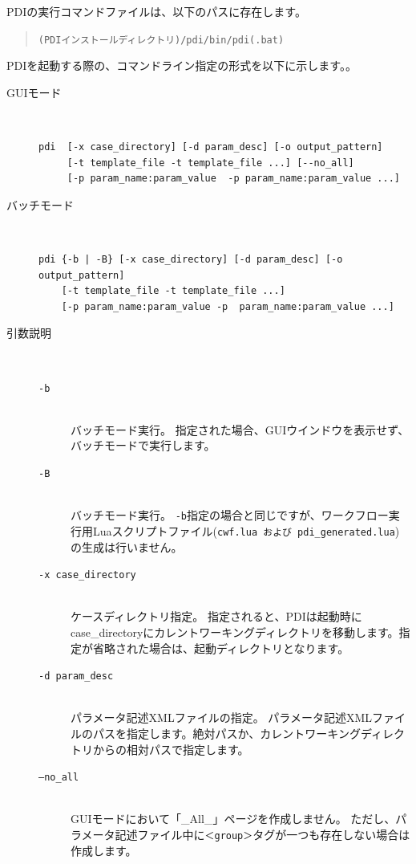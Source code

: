 \documentclass[a4paper,11pt]{jarticle}
\begin{document}
PDIの実行コマンドファイルは、以下のパスに存在します。

\begin{quote}
{\tt (PDIインストールディレクトリ)/pdi/bin/pdi(.bat)}
\end{quote}

PDIを起動する際の、コマンドライン指定の形式を以下に示します。。

\begin{description}
\item[GUIモード] {\ }
\begin{verbatim}
pdi  [-x case_directory] [-d param_desc] [-o output_pattern]
     [-t template_file -t template_file ...] [--no_all]
     [-p param_name:param_value  -p param_name:param_value ...]
\end{verbatim}

\item[バッチモード] {\ }
\begin{verbatim}
pdi {-b | -B} [-x case_directory] [-d param_desc] [-o output_pattern]
    [-t template_file -t template_file ...]
    [-p param_name:param_value -p  param_name:param_value ...]
\end{verbatim}

\item[引数説明] {\ }
\begin{description}
\item[{\tt -b}] {\ }\\
バッチモード実行。
指定された場合、GUIウインドウを表示せず、バッチモードで実行します。
\item[{\tt -B}] {\ }\\
バッチモード実行。
{\tt -b}指定の場合と同じですが、ワークフロー実行用Luaスクリプトファイル({\tt cwf.lua および pdi\_generated.lua})の生成は行いません。
\item[{\tt -x  case\_directory}] {\ }\\
ケースディレクトリ指定。
指定されると、PDIは起動時にcase\_directoryにカレントワーキングディレクトリを移動します。指定が省略された場合は、起動ディレクトリとなります。

\item[{\tt -d  param\_desc}] {\ }\\
パラメータ記述XMLファイルの指定。
パラメータ記述XMLファイルのパスを指定します。絶対パスか、カレントワーキングディレクトリからの相対パスで指定します。

\item[{\tt --no\_all}] {\ }\\ 
GUIモードにおいて「\_All\_」ページを作成しません。
ただし、パラメータ記述ファイル中に{\tt ＜group＞}タグが一つも存在しない場合は
作成します。


\end{description}
\end{description}
\end{document}
